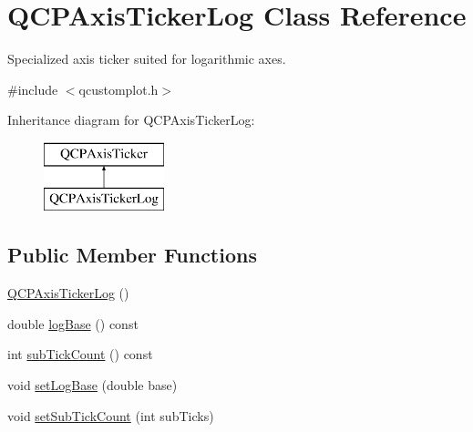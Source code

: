\hypertarget{class_q_c_p_axis_ticker_log}{}\section{Q\+C\+P\+Axis\+Ticker\+Log Class Reference}
\label{class_q_c_p_axis_ticker_log}


Specialized axis ticker suited for logarithmic axes.  




{\ttfamily \#include $<$qcustomplot.\+h$>$}

Inheritance diagram for Q\+C\+P\+Axis\+Ticker\+Log\+:\begin{figure}[H]
\begin{center}
\leavevmode
\includegraphics[height=2.000000cm]{d3/d12/class_q_c_p_axis_ticker_log}
\end{center}
\end{figure}
\subsection*{Public Member Functions}
\begin{DoxyCompactItemize}
\item 
\mbox{\hyperlink{class_q_c_p_axis_ticker_log_af3cb86ea5eef2023c0b96b5260c4cbdf}{Q\+C\+P\+Axis\+Ticker\+Log}} ()
\item 
double \mbox{\hyperlink{class_q_c_p_axis_ticker_log_a841a97f2b6850ff1ef3aa73e89d94775}{log\+Base}} () const
\item 
int \mbox{\hyperlink{class_q_c_p_axis_ticker_log_aebe43661977364fc1fd220fa1ae36a10}{sub\+Tick\+Count}} () const
\item 
void \mbox{\hyperlink{class_q_c_p_axis_ticker_log_ac6e3b4e03baea3816f898869ab9751ef}{set\+Log\+Base}} (double base)
\item 
void \mbox{\hyperlink{class_q_c_p_axis_ticker_log_ad51989c798c0cfd50936d77aac57c56a}{set\+Sub\+Tick\+Count}} (int sub\+Ticks)
\end{DoxyCompactItemize}
